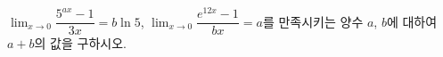 $\displaystyle\lim_{x\to 0}\dfrac{5^{ax}-1}{3x}=b\ln 5$, $\displaystyle\lim_{x\to 0}\dfrac{e^{12x}-1}{bx}=a$를 만족시키는 양수 $a$, $b$에 대하여 $a+b$의 값을 구하시오.
